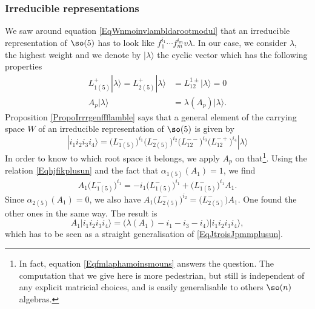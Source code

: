 \subsubsection{Irreducible representations}

We saw around equation \eqref{EqWnmoinvlambldarootmodul} that an irreducible representation of $\so(5)$ has to look like $f_1^{i_1}\cdots f_m^{i_m}v\lambda$. In our case, we consider $\lambda$, the highest weight and we denote by $| \lambda \rangle$ the cyclic vector which has the following properties
\begin{subequations}
	\begin{align}
		L^{+}_{1(5)}| \lambda \rangle=L^{+}_{2(5)}| \lambda \rangle&=L^{1\pm}_{12}| \lambda \rangle=0\\
		A_p| \lambda \rangle&=\lambda(A_p)| \lambda \rangle.
	\end{align}
\end{subequations}
Proposition \ref{PropoIrrrgenffflamble} says that a general element of the carrying space $W$ of an irreducible representation of $\so(5)$ is given by
\begin{equation}
	| i_1i_2i_3i_4 \rangle = \big( L^-_{1(5)} \big)^{i_1} \big( L_{2(5)}^- \big)^{i_2}\big( L^{--}_{12} \big)^{i_3}\big( L^{-+}_{12} \big)^{i_4}	| \lambda \rangle
\end{equation}
In order to know to which root space it belongs, we apply $A_p$ on that\footnote{In fact, equation \eqref{Eqfmlaphamoinsmouns} answers the question. The computation that we give here is more pedestrian, but still is independent of any explicit matricial choices, and is easily generalisable to others $\so(n)$ algebras.}. Using the relation \eqref{Eqhjfikplusun} and the fact that $\alpha_{1(5)}(A_1)=1$, we find
\begin{equation}
	A_1\big( L^-_{1(5)} \big)^{i_1}=-i_1\big( L^-_{1(5)} \big)^{i_1}+\big( L^-_{1(5)} \big)^{i_1}A_1.
\end{equation}
Since $\alpha_{2(5)}(A_1)=0$, we also have $A_1\big( L_{2(5)}^- \big)^{i_2}=\big( L_{2(5)}^- \big)A_1$. One found the other ones in the same way. The result is
\begin{equation}
	A_1| i_1i_2i_3i_4 \rangle=\big( \lambda(A_1)-i_1-i_3-i_4 \big)| i_1i_2i_3i_4 \rangle,
\end{equation}
which has to be seen as a straight generalisation of \eqref{EqJtroisJpmmplusun}.


